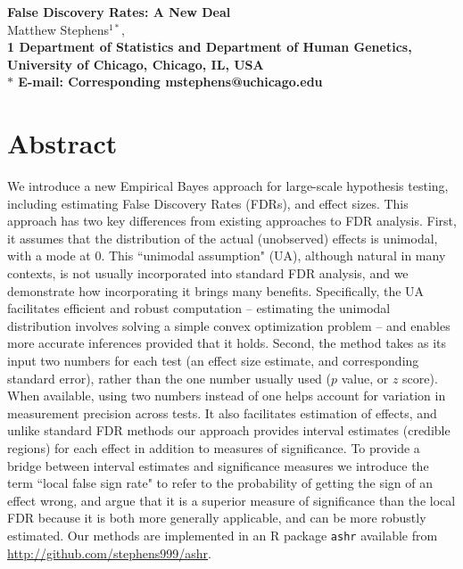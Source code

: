 \documentclass[11pt]{article}
\date{}
\begin{document}
\begin{flushleft}
{\Large
\textbf{False Discovery Rates: A New Deal}
}
\\
Matthew Stephens$^{1*}$, 
\\
\bf{1} Department of Statistics and Department of Human Genetics, University of Chicago, Chicago, IL, USA
\\
$\ast$ E-mail: Corresponding mstephens@uchicago.edu
\end{flushleft}

\section*{Abstract}

We introduce a new Empirical Bayes approach for large-scale hypothesis testing, including  
estimating False Discovery Rates (FDRs), and effect sizes. This approach has two key differences
from existing approaches to FDR analysis. First, it
assumes that the distribution of the actual (unobserved) effects is unimodal, with a mode at 0.
This ``unimodal assumption" (UA), although natural in many contexts, is not usually incorporated into 
standard FDR analysis,
and we demonstrate how incorporating it brings many benefits.  Specifically, the UA
facilitates efficient and robust computation -- estimating the unimodal distribution involves solving a simple convex optimization problem --
and enables more accurate inferences provided that it holds.
Second, the method takes as its input two numbers for each test (an effect size estimate, and corresponding standard error),
rather than the one number usually used ($p$ value, or $z$ score). When available, using two numbers instead of one 
helps account for variation in measurement precision across tests. It also facilitates estimation of  
effects, and unlike standard FDR methods
our approach provides interval estimates (credible regions) for each effect in addition to measures of significance.
To provide a bridge between interval estimates and significance measures we introduce the term ``local false sign rate"
to refer to the probability of getting the sign of an effect wrong, and argue that it is a superior
measure of significance than the local FDR because it is both more generally applicable, and
can be more robustly estimated. Our methods are implemented in an R package {\tt ashr}
available from \url{http://github.com/stephens999/ashr}. 
\end{document}

